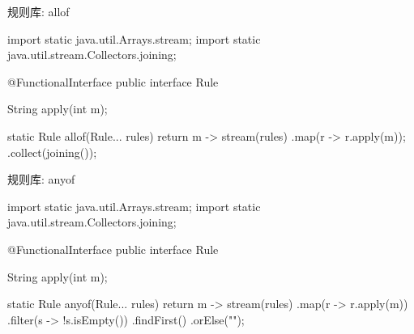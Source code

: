\begin{frame}[fragile]{规则库: allof}
  \begin{java}
import static java.util.Arrays.stream;
import static java.util.stream.Collectors.joining;

@FunctionalInterface
public interface Rule {
  String apply(int m);

  static Rule allof(Rule... rules) {
    return m -> stream(rules)
      .map(r -> r.apply(m));
      .collect(joining());
  }
}
  \end{java}
\end{frame}

\begin{frame}[fragile]{规则库: anyof}
  \begin{java}
import static java.util.Arrays.stream;
import static java.util.stream.Collectors.joining;

@FunctionalInterface
public interface Rule {
  String apply(int m);

  static Rule anyof(Rule... rules) {
    return m -> stream(rules)
      .map(r -> r.apply(m))
      .filter(s -> !s.isEmpty())
      .findFirst()
      .orElse("");
  }
}
  \end{java}
\end{frame}
